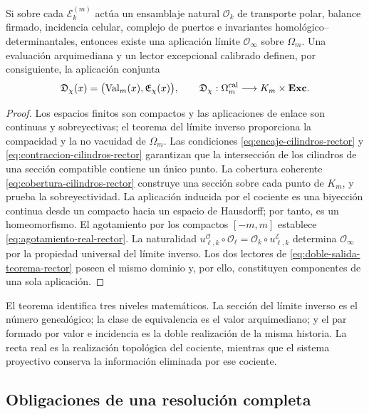 \begin{theorem}
Si sobre cada \(\mathcal E_k^{(m)}\) act\'ua un ensamblaje natural
\(\mathcal O_k\) de transporte polar, balance firmado, incidencia celular,
complejo de puertos e invariantes homol\'ogico--determinantales, entonces
existe una aplicaci\'on l\'imite \(\mathcal O_\infty\) sobre \(\Omega_m\).
Una evaluaci\'on arquimediana y un lector excepcional calibrado definen, por
consiguiente, la aplicaci\'on conjunta
\begin{equation}
 \mathfrak D_{\chi}(x)=
 \bigl(\operatorname{Val}_m(x),\mathfrak E_\chi(x)\bigr),
 \qquad
 \mathfrak D_\chi:\Omega_m^{\rm cal}
 \longrightarrow K_m\times\mathbf{Exc}.
 \label{eq:doble-salida-teorema-rector}
\end{equation}
\end{theorem}

\begin{proof}
Los espacios finitos son compactos y las aplicaciones de enlace son
continuas y sobreyectivas; el teorema del l\'imite inverso proporciona la
compacidad y la no vacuidad de \(\Omega_m\). Las condiciones
\eqref{eq:encaje-cilindros-rector} y
\eqref{eq:contraccion-cilindros-rector} garantizan que la intersecci\'on de
los cilindros de una secci\'on compatible contiene un \'unico punto. La
cobertura coherente \eqref{eq:cobertura-cilindros-rector} construye una
secci\'on sobre cada punto de \(K_m\), y prueba la sobreyectividad. La
aplicaci\'on inducida por el cociente es una biyecci\'on continua desde un
compacto hacia un espacio de Hausdorff; por tanto, es un homeomorfismo. El
agotamiento por los compactos \([-m,m]\) establece
\eqref{eq:agotamiento-real-rector}. La naturalidad
\(u^{\mathcal O}_{\ell,k}\circ\mathcal O_\ell
=\mathcal O_k\circ u^{\mathcal E}_{\ell,k}\) determina
\(\mathcal O_\infty\) por la propiedad universal del l\'imite inverso. Los
dos lectores de \eqref{eq:doble-salida-teorema-rector} poseen el mismo
dominio y, por ello, constituyen componentes de una sola aplicaci\'on.
\end{proof}

El teorema identifica tres niveles matem\'aticos. La secci\'on del l\'imite
inverso es el n\'umero geneal\'ogico; la clase de equivalencia es el valor
arquimediano; y el par formado por valor e incidencia es la doble
realizaci\'on de la misma historia. La recta real es la realizaci\'on
topol\'ogica del cociente, mientras que el sistema proyectivo conserva la
informaci\'on eliminada por ese cociente.

\subsection{Obligaciones de una resoluci\'on completa}

